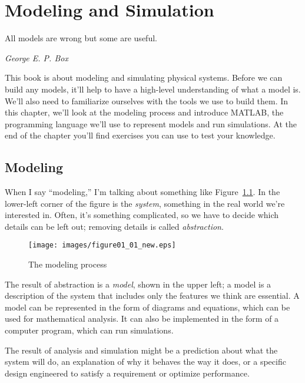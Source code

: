 \chapter{Modeling and Simulation}
\label{modeling}

\epigraph{All models are wrong \linebreak but some are useful.}{\textit{George E. P. Box}}

This book is about modeling and simulating physical systems. Before we can build any models, it'll help to have a high-level understanding of what a model is. We'll also need to familiarize ourselves with the tools we use to build them. In this chapter, we'll look at the modeling process and introduce MATLAB, the programming language we'll use to represent models and run \mbox{simulations}. At the end of the chapter you'll find exercises you can use to test your knowledge.


\section{Modeling}

When I say ``modeling,'' I'm talking about something like Figure~\ref{fig:modeling}.
In the lower-left corner of the figure is the \emph{system}, something in the real world we're interested in.  Often, it's something complicated, so we have to decide which
details can be left out; removing details is called \emph{abstraction}.

\begin{figure}[h]
  \centerline{\texttt{[image: images/figure01\_01\_new.eps]}}
  \caption{The modeling process}
  \label{fig:modeling}
\end{figure}



The result of abstraction is a \emph{model}, shown in the upper left; a model is a description of the system that includes only the features we think are essential.  A model can be represented in the form of diagrams and equations, which can be used for mathematical analysis.  It can also be implemented in the form of a computer program, which can run simulations.


The result of analysis and simulation might be a prediction about what the system will do, an explanation of why it behaves the way it does, or a specific design engineered to satisfy a requirement or optimize performance.

